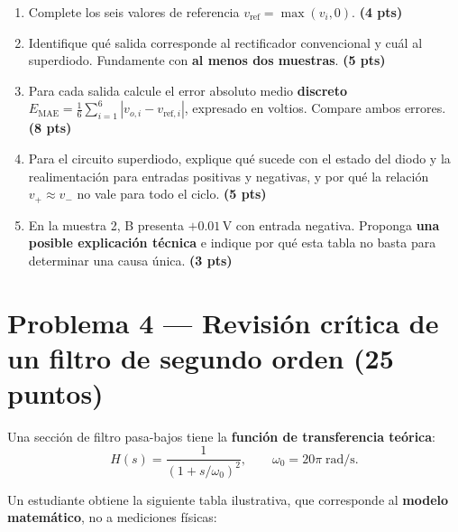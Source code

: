 \documentclass[10pt, a4paper]{article}
\begin{document}
\begin{enumerate}
    \setlength{\itemsep}{2pt}
    \item Complete los seis valores de referencia $v_{\mathrm{ref}} = \max(v_i, 0)$. \hfill \textbf{(4 pts)}
    \item Identifique qué salida corresponde al rectificador convencional y cuál al superdiodo. Fundamente con \textbf{al menos dos muestras}. \hfill \textbf{(5 pts)}
    \item Para cada salida calcule el error absoluto medio \textbf{discreto} $E_{\mathrm{MAE}} = \frac{1}{6}\sum_{i=1}^{6}|v_{o,i} - v_{\mathrm{ref},i}|$, expresado en voltios. Compare ambos errores. \hfill \textbf{(8 pts)}
    \item Para el circuito superdiodo, explique qué sucede con el estado del diodo y la realimentación para entradas positivas y negativas, y por qué la relación $v_+ \approx v_-$ no vale para todo el ciclo. \hfill \textbf{(5 pts)}
    \item En la muestra 2, B presenta $+0.01\,\mathrm{V}$ con entrada negativa. Proponga \textbf{una posible explicación técnica} e indique por qué esta tabla no basta para determinar una causa única. \hfill \textbf{(3 pts)}
\end{enumerate}

\section*{Problema 4 --- Revisión crítica de un filtro de segundo orden (25 puntos)}

Una sección de filtro pasa-bajos tiene la \textbf{función de transferencia teórica}:
\[H(s) = \frac{1}{(1 + s/\omega_0)^2}, \qquad \omega_0 = 20\pi\;\mathrm{rad/s}.\]

Un estudiante obtiene la siguiente tabla ilustrativa, que corresponde al \textbf{modelo matemático}, no a mediciones físicas:
\end{document}
